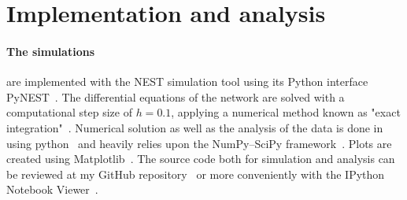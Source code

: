 \FloatBarrier
\section{Implementation and analysis}
\label{subsec:analysis}
\paragraph{The simulations} are implemented with the NEST simulation tool using its Python interface
PyNEST~\cite{NEST}. The differential equations of the network are solved with a computational 
step size of $h=0.1$, applying a numerical method known as "exact integration"~\cite{rotter1999exact}.
Numerical solution as well as the analysis of the data is done in using 
python~\cite{python} and heavily relies upon the NumPy--SciPy framework~\cite{scipy}. 
Plots are created using Matplotlib~\cite{matplotlib}.
The source code both for simulation and analysis can be reviewed at my
GitHub repository~\cite{ba_github} or more conveniently with the 
IPython Notebook Viewer~\cite{notebook_viewer}.

